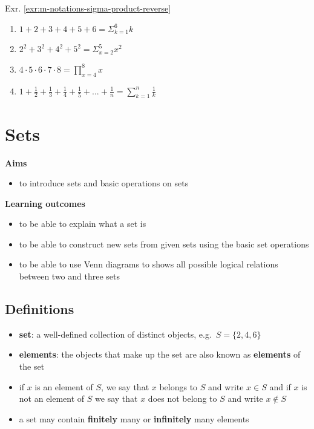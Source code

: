\documentclass[
]{book}
\providecommand{\tightlist}{%
  \setlength{\itemsep}{0pt}\setlength{\parskip}{0pt}}
\theoremstyle{definition}
\theoremstyle{definition}
\theoremstyle{definition}
\theoremstyle{remark}
\begin{document}
Exr. \ref{exr:m-notations-sigma-product-reverse}

\begin{enumerate}
\def\labelenumi{\alph{enumi})}
\item
  \(1+2+3+4+5+6 = \Sigma_{k=1}^{6}k\)
\item
  \(2^2+3^2+4^2+5^2 = \Sigma_{x=2}^{5}x^2\)
\item
  \(4 \cdot 5 \cdot 6 \cdot 7 \cdot 8 = \prod_{x=4}^{8}x\)
\item
  \(1 + \frac{1}{2} + \frac{1}{3} + \frac{1}{4} + \frac{1}{5} + ... + \frac{1}{n} = \displaystyle \sum_{k=1}^{n}\frac{1}{k}\)
\end{enumerate}

\hypertarget{sets}{%
\chapter{Sets}\label{sets}}

\textbf{Aims}

\begin{itemize}
\tightlist
\item
  to introduce sets and basic operations on sets
\end{itemize}

\textbf{Learning outcomes}

\begin{itemize}
\tightlist
\item
  to be able to explain what a set is
\item
  to be able to construct new sets from given sets using the basic set operations
\item
  to be able to use Venn diagrams to shows all possible logical relations between two and three sets
\end{itemize}

\hypertarget{definitions}{%
\section{Definitions}\label{definitions}}

\begin{itemize}
\tightlist
\item
  \textbf{set}: a well-defined collection of distinct objects, e.g.~\(S = \{2, 4, 6\}\)
\item
  \textbf{elements}: the objects that make up the set are also known as \textbf{elements} of the set
\item
  if \(x\) is an element of \(S\), we say that \(x\) belongs to \(S\) and write \(x \in S\) and if \(x\) is not an element of \(S\) we say that \(x\) does not belong to \(S\) and write \(x \notin S\)
\item
  a set may contain \textbf{finitely} many or \textbf{infinitely} many elements
\end{itemize}
\end{document}
